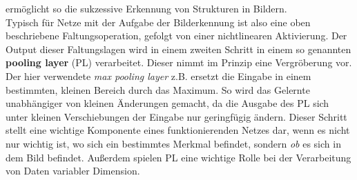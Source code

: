 ermöglicht so die sukzessive Erkennung von Strukturen in Bildern. \\
Typisch für Netze mit der Aufgabe der Bilderkennung ist also eine oben
beschriebene Faltungsoperation, gefolgt von einer nichtlinearen Aktivierung.
Der Output dieser Faltungslagen wird in einem zweiten Schritt in einem so
genannten \textbf{pooling layer} (PL) verarbeitet. Dieser nimmt im Prinzip eine
Vergröberung vor. Der hier verwendete \textit{max pooling layer} z.B. ersetzt
die Eingabe in einem bestimmten, kleinen Bereich durch das Maximum. So wird das
Gelernte unabhängiger von kleinen Änderungen gemacht, da die Ausgabe des PL sich
unter kleinen Verschiebungen der Eingabe nur geringfügig ändern. Dieser Schritt
stellt eine wichtige Komponente eines funktionierenden Netzes dar, wenn es
nicht nur wichtig ist, wo sich ein bestimmtes Merkmal befindet, sondern
\textit{ob} es sich in dem Bild befindet.
Außerdem spielen PL eine wichtige Rolle bei der Verarbeitung von Daten
variabler Dimension.
